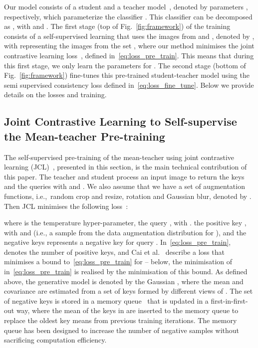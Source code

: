 \documentclass[runningheads]{llncs}
\begin{document}
Our model consists of a  student and a teacher model~\cite{tarvainen2017mean}, denoted by parameters , respectively, which parameterize the classifier .
This classifier can be decomposed as , with  and .
The first stage (top of Fig.~\ref{fig:framework}) of the training consists of a self-supervised learning that uses the images from  and , denoted by , with  representing the images from the set , where our method minimises the joint contrastive learning loss~\cite{cai2020joint}, defined in~\eqref{eq:loss_pre_train}.  This means that during this first stage, we only learn the parameters for .
The second stage (bottom of Fig.~\ref{fig:framework}) fine-tunes this pre-trained student-teacher model using the semi supervised consistency loss defined in~\eqref{eq:loss_fine_tune}. Below we provide details on the losses and training.





\vspace{-.1in}
\subsection{Joint Contrastive Learning to Self-supervise the Mean-teacher Pre-training}




The self-supervised pre-training of the mean-teacher using joint contrastive learning (JCL)~\cite{cai2020joint}, presented in this section, is the main technical contribution of this paper. 
The teacher and student process an input image to return the keys  and the queries  with  and . We also assume that we have a set of augmentation functions, i.e.,~random crop and resize, rotation and Gaussian blur, denoted by .    
Then JCL minimises the following loss~\cite{cai2020joint}:

where  is the temperature hyper-parameter, the query , with .
the positive key , with  and  (i.e., a sample from the data augmentation distribution for ), and the negative keys  represents a negative key for query . 
In~\eqref{eq:loss_pre_train},  denotes the number of positive keys, and Cai et al.~\cite{cai2020joint} describe a loss that minimises a bound to~\eqref{eq:loss_pre_train} for  -- below, the minimisation of  in~\eqref{eq:loss_pre_train} is realised by the minimisation of this bound.
As defined above, the generative model  is denoted by the Gaussian 
, where the mean  and covariance  are estimated from a set of keys  formed by different views of .
The set of negative keys  is stored in a memory queue~\cite{moco} that is updated in a first-in-first-out way, where the mean of the keys in  are inserted to the memory queue to replace the oldest key means from previous training iterations. The memory queue has been designed to increase the number of negative samples without sacrificing computation efficiency. 
\end{document}
